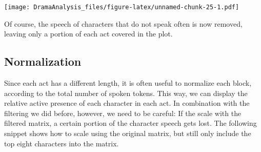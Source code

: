 \documentclass[]{book}
\begin{document}
\texttt{[image: DramaAnalysis\_files/figure-latex/unnamed-chunk-25-1.pdf]}

Of course, the speech of characters that do not speak often is now removed, leaving only a portion of each act covered in the plot.

\hypertarget{normalization}{%
\subsection{Normalization}\label{normalization}}

Since each act has a different length, it is often useful to normalize each block, according to the total number of spoken tokens. This way, we can display the relative active presence of each character in each act. In combination with the filtering we did before, however, we need to be careful: If the scale with the filtered matrix, a certain portion of the character speech gets lost. The following snippet shows how to scale using the original matrix, but still only include the top eight characters into the matrix.
\end{document}

